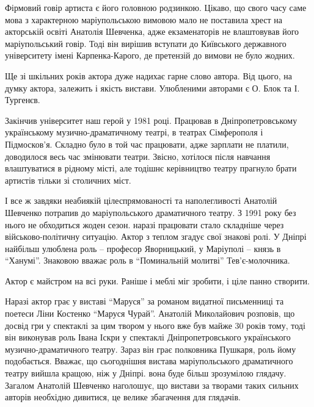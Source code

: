 
Фірмовий говір артиста є його головною родзинкою. Цікаво, що свого часу саме
мова з характерною маріупольською вимовою мало не поставила хрест на
акторській освіті Анатолія Шевченка, адже екзаменаторів не влаштовував його
маріупольський говір. Тоді він вирішив вступати до Київського державного
університету імені Карпенка-Карого, де претензій до вимови не було жодних.

Ще зі шкільних років актора дуже надихає гарне слово автора. Від цього, на
думку актора, залежить і якість вистави. Улюбленими авторами є О. Блок та І.
Тургенєв.


Закінчив університет наш герой у 1981 році. Працював в Дніпропетровському
українському музично-драматичному театрі, в театрах Сімферополя і Підмосков'я.
Складно було в той час працювати, адже зарплати не платили, доводилося весь
час змінювати театри. Звісно, хотілося після навчання влаштуватися в рідному
місті, але тодішнє керівництво театру прагнуло брати артистів тільки зі
столичних міст.

І все ж завдяки неабиякій цілеспрямованості та наполегливості Анатолій Шевченко
потрапив до маріупольського драматичного театру. З 1991 року без нього не
обходиться жоден сезон. наразі працювати стало складніше через
військово-політичну ситуацію. Актор з теплом згадує свої знакові ролі. У Дніпрі
найбільш улюблена роль – професор Яворницький, у Маріуполі – князь в \enquote{Ханумі}.
Знаковою вважає роль в \enquote{Поминальній молитві} Тев'є-молочника.

Актор є майстром на всі руки. Раніше і меблі міг зробити, і ціле панно
створити.


Наразі актор грає у виставі \enquote{Маруся} за романом видатної письменниці та
поетеси Ліни Костенко \enquote{Маруся Чурай}. Анатолій Миколайович розповів, що досвід
гри у спектаклі за цим твором у нього вже був майже 30 років тому, тоді він
виконував роль Івана Іскри у спектаклі Дніпропетровського українського
музично-драматичного театру. Зараз він грає полковника Пушкаря, роль йому
подобається. Вважає, що сьогоднішня вистава маріупольського драматичного
театру вийшла кращою, ніж у Дніпрі. вона буде більш зрозумілою глядачу.
Загалом Анатолій Шевченко наголошує, що вистави за творами таких сильних
авторів необхідно дивитися, це велике збагачення для глядачів.


